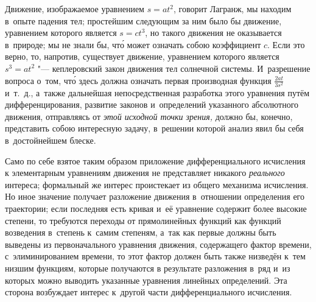 Движение, изображаемое уравнением $s=at^2$, говорит Лагранж, мы находим в~опыте
падения тел; простейшим следующим за ним было бы движение, уравнением которого
является $s=ct^3$, но такого движения не оказывается в~природе; мы не знали бы,
чт\'{о} может означать собою коэффициент $c$. Если это верно, то, напротив,
существует движение, уравнением которого является $s^3=at^2$ "--- кеплеровский
закон движения тел солнечной системы. И~разрешение вопроса о~том, чт\'{о} здесь
должна означать первая производная функция $\frac{2at}{3s^2}$ и~т.~д., а~также
дальнейшая непосредственная разработка этого уравнения путём дифференцирования,
развитие законов и~определений указанного абсолютного движения, отправляясь от
{\em этой исходной точки зрения,} должно бы, конечно, представить собою
интересную задачу, в~решении которой анализ явил бы себя в~достойнейшем блеске.

Само по себе взятое таким образом приложение дифференциального исчисления
к элементарным уравнениям движения не представляет никакого {\em реального} интереса;
формальный же интерес проистекает из общего механизма исчисления. Но иное
значение получает разложение движения в~отношении определения его траектории;
если последняя есть кривая и~её уравнение содержит более высокие степени, то требуются
переходы от прямолинейных функций как функций возведения в~степень к~самим степеням, а~так
как первые должны быть выведены из первоначального уравнения движения,
содержащего фактор времени, с~элиминированием времени, то этот фактор
должен быть также низведён к~тем низшим функциям, которые получаются
в результате разложения в~ряд и~из которых
можно выводить указанные уравнения линейных определений. Эта сторона
возбуждает интерес к~другой части дифференциального исчисления.

